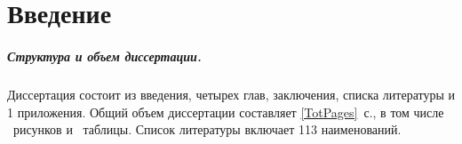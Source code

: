 
\chapter*{Введение}                         %



\paragraph*{Структура и объем диссертации.}
Диссертация состоит из введения,
четырех глав, заключения, списка литературы и 1 приложения.
Общий объем диссертации составляет \ref*{TotPages}~с.,
в том числе \totalfigures{}~рисунков и \totaltables{}~таблицы.
Список литературы включает 113 наименований.
